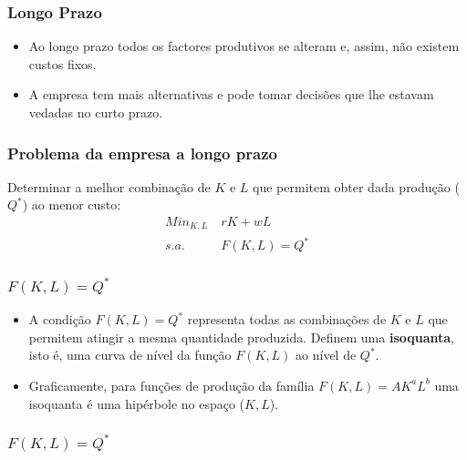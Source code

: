 \begin{frame}
	\frametitle{Longo Prazo}
	\begin{itemize}
		\setlength\itemsep{1em}
		\item Ao longo prazo todos os factores produtivos se alteram e, assim, n\~ao existem custos fixos.
		\item A empresa tem mais alternativas e pode tomar decis\~oes que lhe estavam vedadas no curto prazo.
	\end{itemize}
\end{frame}

\begin{frame}
	\frametitle{Problema da empresa a longo prazo}
		Determinar a melhor combina\c c\~ao de $K$ e $L$ que permitem obter dada produ\c c\~ao ($Q^*$) ao menor custo: 
		\begin{align*}
			Min_{K,L}\ &rK+wL\\
			 s.a.\ &F(K,L)=Q^*
		\end{align*}
\end{frame}

\begin{frame}
	\frametitle{$F(K,L)=Q^*$}
	\begin{itemize}
		\setlength\itemsep{1em}
		\item A condi\c c\~ao $F(K,L)=Q^*$ representa todas as combina\c c\~oes de $K$ e $L$ que permitem atingir a mesma quantidade produzida. Definem uma \textbf{isoquanta}, isto \'e, uma curva de n\'ivel da fun\c c\~ao $F(K,L)$ ao n\'ivel de $Q^*$.
		\item Graficamente, para fun\c c\~oes de produ\c c\~ao da fam\'ilia $F(K,L)=AK^aL^b$ uma isoquanta \'e uma hip\'erbole no espa\c co ($K,L$).
	\end{itemize}
\end{frame}

\begin{frame}
	\frametitle{$F(K,L)=Q^*$}
	\begin{center}
	\end{center}
\end{frame}

